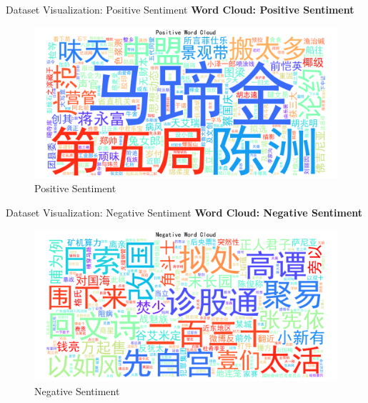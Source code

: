 \documentclass[aspectratio=169]{beamer}
\begin{document}
\begin{frame}{Dataset Visualization: Positive Sentiment}
  \textbf{Word Cloud: Positive Sentiment}
  \begin{figure}
    \centering
    \includegraphics[width=0.7\linewidth]{wordcloud_positive.png}
    \caption{\small Positive Sentiment}
  \end{figure}
\end{frame}

\begin{frame}{Dataset Visualization: Negative Sentiment}
  \textbf{Word Cloud: Negative Sentiment}
  \begin{figure}
    \centering
    \includegraphics[width=0.7\linewidth]{wordcloud_negative.png}
    \caption{\small Negative Sentiment}
  \end{figure}
\end{frame}
  
\end{document}
